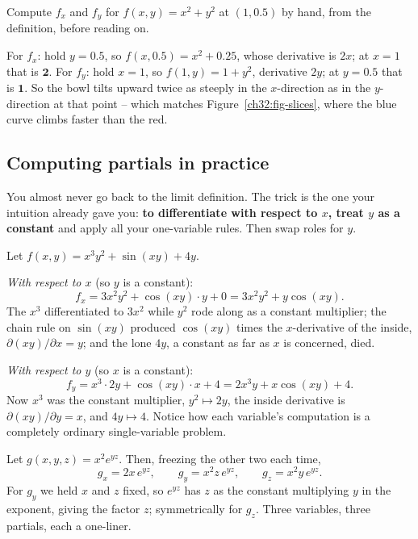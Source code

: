 \begin{labbox}
Compute $f_x$ and $f_y$ for $f(x,y)=x^2+y^2$ at $(1,0.5)$ by hand, from the definition, before
reading on.

For $f_x$: hold $y=0.5$, so $f(x,0.5)=x^2+0.25$, whose derivative is $2x$; at $x=1$ that is
$\mathbf{2}$. For $f_y$: hold $x=1$, so $f(1,y)=1+y^2$, derivative $2y$; at $y=0.5$ that is
$\mathbf{1}$. So the bowl tilts upward twice as steeply in the $x$-direction as in the
$y$-direction at that point -- which matches Figure~\ref{ch32:fig-slices}, where the blue
curve climbs faster than the red.
\end{labbox}

\subsection*{Computing partials in practice}

You almost never go back to the limit definition. The trick is the one your intuition already
gave you: \textbf{to differentiate with respect to $x$, treat $y$ as a constant} and apply all
your one-variable rules. Then swap roles for $y$.

\begin{example}
\label{ch32:ex-compute}
Let $f(x,y) = x^3 y^2 + \sin(xy) + 4y$.

\emph{With respect to $x$} (so $y$ is a constant):
\[
   f_x = 3x^2 y^2 + \cos(xy)\cdot y + 0 = 3x^2 y^2 + y\cos(xy).
\]
The $x^3$ differentiated to $3x^2$ while $y^2$ rode along as a constant multiplier; the chain
rule on $\sin(xy)$ produced $\cos(xy)$ times the $x$-derivative of the inside,
$\partial(xy)/\partial x = y$; and the lone $4y$, a constant as far as $x$ is concerned, died.

\emph{With respect to $y$} (so $x$ is a constant):
\[
   f_y = x^3\cdot 2y + \cos(xy)\cdot x + 4 = 2x^3 y + x\cos(xy) + 4.
\]
Now $x^3$ was the constant multiplier, $y^2 \mapsto 2y$, the inside derivative is
$\partial(xy)/\partial y = x$, and $4y \mapsto 4$. Notice how each variable's computation is a
completely ordinary single-variable problem.
\end{example}

\begin{example}
\label{ch32:ex-three}
Let $g(x,y,z) = x^2 e^{yz}$. Then, freezing the other two each time,
\[
   g_x = 2x\,e^{yz}, \qquad
   g_y = x^2 z\,e^{yz}, \qquad
   g_z = x^2 y\,e^{yz}.
\]
For $g_y$ we held $x$ and $z$ fixed, so $e^{yz}$ has $z$ as the constant multiplying $y$ in the
exponent, giving the factor $z$; symmetrically for $g_z$. Three variables, three partials, each
a one-liner.
\end{example}

